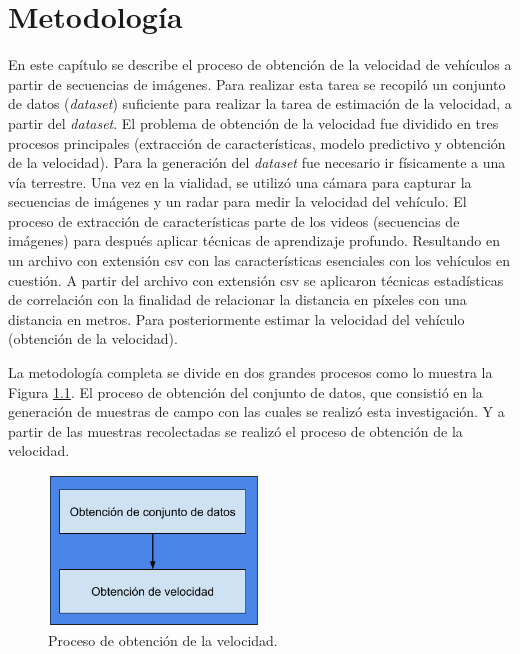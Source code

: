 \chapter{Metodología}
\label{cap:metodologia}

En este capítulo se describe el proceso de obtención de la velocidad de vehículos a partir de secuencias de imágenes. Para realizar esta tarea se recopiló un conjunto de datos (\textit{dataset}) suficiente para  realizar la tarea de estimación de la velocidad,  a partir del \textit{dataset}. El problema de obtención de la velocidad fue dividido en tres procesos principales (extracción de características, modelo predictivo y obtención de la velocidad). Para la generación del \textit{dataset} fue necesario ir físicamente a una vía terrestre. Una vez en la vialidad, se utilizó una cámara para capturar la secuencias de imágenes y un radar para medir la velocidad del vehículo. El proceso de extracción de características parte de los videos (secuencias de imágenes) para después aplicar técnicas de aprendizaje profundo. Resultando en un archivo con extensión csv con las características esenciales con los vehículos en cuestión. A partir del archivo con extensión csv se aplicaron técnicas estadísticas de correlación con la finalidad de relacionar la distancia en píxeles con una distancia en metros. Para posteriormente estimar la velocidad del vehículo (obtención de la velocidad). 


La metodología completa se divide en dos grandes procesos como lo muestra la Figura \ref{fig:MetodologiaDF}. El proceso de obtención del conjunto de datos, que consistió en la generación de muestras de campo con las cuales se realizó esta investigación. Y a partir de las muestras recolectadas se realizó el proceso de obtención de la velocidad.

\begin{figure}[H]
    \centering
    \includegraphics[width=0.5\textwidth]{Metodologia/imgs/ProcesoObtencionVelocidad.png}
    \caption{Proceso de obtención de la velocidad.}
    \label{fig:MetodologiaDF}
\end{figure}






